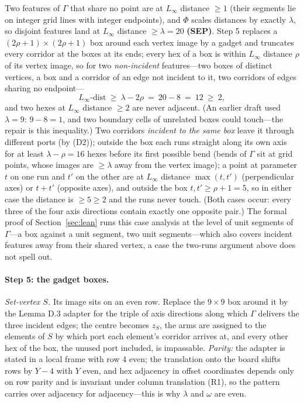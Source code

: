 \documentclass[11pt,a4paper]{article}
\theoremstyle{plain}
\theoremstyle{definition}
\theoremstyle{plain}
\theoremstyle{definition}
\theoremstyle{remark}
\begin{document}
Two features of $\Gamma$ that share no point are at $L_\infty$ distance $\ge 1$ (their segments
lie on integer grid lines with integer endpoints), and $\Phi$ scales distances by exactly
$\lambda$, so disjoint features land at $L_\infty$ distance $\ge\lambda=20$ \textbf{(SEP)}.
Step 5 replaces a $(2\rho+1)\times(2\rho+1)$ box around each vertex image by a gadget and
truncates every corridor at the boxes at its ends; every hex of a box is within $L_\infty$
distance $\rho$ of its vertex image, so for two \emph{non-incident} features---two boxes of
distinct vertices, a box and a corridor of an edge not incident to it, two corridors of edges
sharing no endpoint---
\begin{equation*}
  L_\infty\text{-dist}\ \ge\ \lambda-2\rho\ =\ 20-8\ =\ 12\ \ge\ 2,
  \tag{SEP$'$}
\end{equation*}
and two hexes at $L_\infty$ distance $\ge 2$ are never adjacent. (An earlier draft used
$\lambda=9$: $9-8=1$, and two boundary cells of unrelated boxes could touch---the repair is this
inequality.) Two corridors \emph{incident to the same box} leave it through different ports (by
(D2)); outside the box each runs straight along its own axis for at least $\lambda-\rho=16$ hexes
before its first possible bend (bends of $\Gamma$ sit at grid points, whose images are
$\ge\lambda$ away from the vertex image); a point at parameter $t$ on one run and $t'$ on the
other are at $L_\infty$ distance $\max(t,t')$ (perpendicular axes) or $t+t'$ (opposite axes), and
outside the box $t,t'\ge\rho+1=5$, so in either case the distance is $\ge 5\ge 2$ and the runs
never touch. (Both
cases occur: every three of the four axis directions contain exactly one opposite pair.) The
formal proof of Section~\ref{sec:lean} runs this case analysis at the level of unit segments
of $\Gamma$---a box against a unit segment, two unit segments---which also covers incident
features away from their shared vertex, a case the two-runs argument above does not spell
out.

\paragraph{Step 5: the gadget boxes.} \emph{Set-vertex $S$.} Its image sits on an even row.
Replace the $9\times 9$ box around it by the Lemma D.3 adapter for the triple of axis directions
along which $\Gamma$ delivers the three incident edges; the centre becomes $z_S$, the arms are
assigned to the elements of $S$ by which port each element's corridor arrives at, and every other
hex of the box, the unused port included, is impassable. \emph{Parity:} the adapter is stated in
a local frame with row 4 even; the translation onto the board shifts rows by $Y-4$ with $Y$ even,
and hex adjacency in offset coordinates depends only on row parity and is invariant under column
translation (R1), so the pattern carries over adjacency for adjacency---this is why $\lambda$ and
$\omega$ are even.
\end{document}
